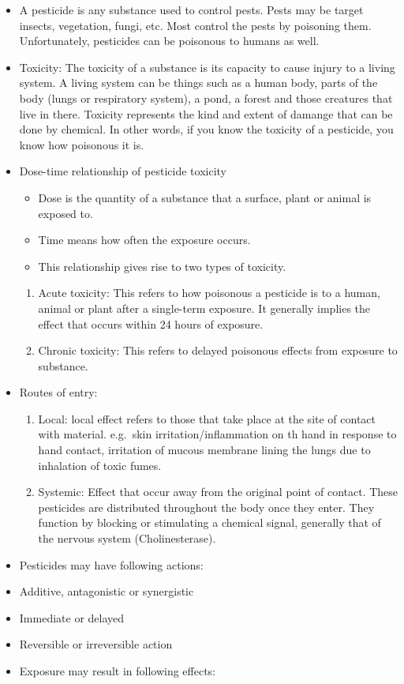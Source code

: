 \documentclass[
  openany]{book}
\providecommand{\tightlist}{%
  \setlength{\itemsep}{0pt}\setlength{\parskip}{0pt}}
\begin{document}
\begin{itemize}
\item
  A pesticide is any substance used to control pests. Pests may be target insects, vegetation, fungi, etc. Most control the pests by poisoning them. Unfortunately, pesticides can be poisonous to humans as well.
\item
  Toxicity: The toxicity of a substance is its capacity to cause injury to a living system. A living system can be things such as a human body, parts of the body (lungs or respiratory system), a pond, a forest and those creatures that live in there. Toxicity represents the kind and extent of damange that can be done by chemical. In other words, if you know the toxicity of a pesticide, you know how poisonous it is.
\item
  Dose-time relationship of pesticide toxicity

  \begin{itemize}
  \tightlist
  \item
    Dose is the quantity of a substance that a surface, plant or animal is exposed to.
  \item
    Time means how often the exposure occurs.
  \item
    This relationship gives rise to two types of toxicity.
  \end{itemize}

  \begin{enumerate}
  \def\labelenumi{\arabic{enumi}.}
  \tightlist
  \item
    Acute toxicity: This refers to how poisonous a pesticide is to a human, animal or plant after a single-term exposure. It generally implies the effect that occurs within 24 hours of exposure.
  \item
    Chronic toxicity: This refers to delayed poisonous effects from exposure to substance.
  \end{enumerate}
\item
  Routes of entry:

  \begin{enumerate}
  \def\labelenumi{\arabic{enumi}.}
  \tightlist
  \item
    Local: local effect refers to those that take place at the site of contact with material. e.g.~skin irritation/inflammation on th hand in response to hand contact, irritation of mucous membrane lining the lungs due to inhalation of toxic fumes.
  \item
    Systemic: Effect that occur away from the original point of contact. These pesticides are distributed throughout the body once they enter. They function by blocking or stimulating a chemical signal, generally that of the nervous system (Cholinesterase).
  \end{enumerate}
\item
  Pesticides may have following actions:
\item
  Additive, antagonistic or synergistic
\item
  Immediate or delayed
\item
  Reversible or irreversible action
\item
  Exposure may result in following effects:


\end{itemize}
\end{document}
